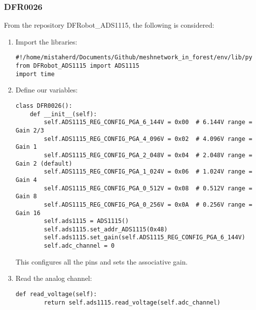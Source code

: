 \subsubsection{DFR0026}
\label{ADC section}
From the repository DFRobot\_ADS1115, the following is considered:
\begin{enumerate}

\item Import the libraries: 

\begin{lstlisting}[style=mystyle]
#!/home/mistaherd/Documents/Github/meshnetwork_in_forest/env/lib/python3.11
from DFRobot_ADS1115 import ADS1115
import time
\end{lstlisting}
    
\item Define our variables:
     
\begin{lstlisting}[style=mystyle]
class DFR0026():
    def __init__(self):
        self.ADS1115_REG_CONFIG_PGA_6_144V = 0x00  # 6.144V range = Gain 2/3
        self.ADS1115_REG_CONFIG_PGA_4_096V = 0x02  # 4.096V range = Gain 1
        self.ADS1115_REG_CONFIG_PGA_2_048V = 0x04  # 2.048V range = Gain 2 (default)
        self.ADS1115_REG_CONFIG_PGA_1_024V = 0x06  # 1.024V range = Gain 4
        self.ADS1115_REG_CONFIG_PGA_0_512V = 0x08  # 0.512V range = Gain 8
        self.ADS1115_REG_CONFIG_PGA_0_256V = 0x0A  # 0.256V range = Gain 16
        self.ads1115 = ADS1115()
        self.ads1115.set_addr_ADS1115(0x48)
        self.ads1115.set_gain(self.ADS1115_REG_CONFIG_PGA_6_144V)
        self.adc_channel = 0
\end{lstlisting}
    
This configures all the pins and sets the associative gain.
    
\item Read the analog channel:

\begin{lstlisting}[style=mystyle]
    def read_voltage(self):
        return self.ads1115.read_voltage(self.adc_channel)
\end{lstlisting}

\end{enumerate}
    
\newpage
